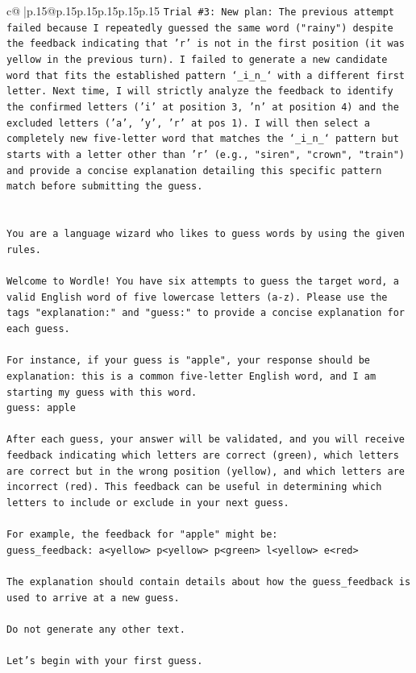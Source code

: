 \documentclass{article}
\begin{document}
{\begin{supertabular}{c@{$\;$}|p{.15\linewidth}@{}p{.15\linewidth}p{.15\linewidth}p{.15\linewidth}p{.15\linewidth}p{.15\linewidth}}
{{{\texttt{Trial \#3: New plan: The previous attempt failed because I repeatedly guessed the same word ("rainy") despite the feedback indicating that 'r' is not in the first position (it was yellow in the previous turn). I failed to generate a new candidate word that fits the established pattern `\_i\_n\_` with a different first letter. Next time, I will strictly analyze the feedback to identify the confirmed letters ('i' at position 3, 'n' at position 4) and the excluded letters ('a', 'y', 'r' at pos 1). I will then select a completely new five{-}letter word that matches the `\_i\_n\_` pattern but starts with a letter other than 'r' (e.g., "siren", "crown", "train") and provide a concise explanation detailing this specific pattern match before submitting the guess.} \\
\\ 
\\ 
\texttt{You are a language wizard who likes to guess words by using the given rules.} \\
\\ 
\texttt{Welcome to Wordle! You have six attempts to guess the target word, a valid English word of five lowercase letters (a{-}z). Please use the tags "explanation:" and "guess:" to provide a concise explanation for each guess.} \\
\\ 
\texttt{For instance, if your guess is "apple", your response should be} \\
\texttt{explanation: this is a common five{-}letter English word, and I am starting my guess with this word.} \\
\texttt{guess: apple} \\
\\ 
\texttt{After each guess, your answer will be validated, and you will receive feedback indicating which letters are correct (green), which letters are correct but in the wrong position (yellow), and which letters are incorrect (red). This feedback can be useful in determining which letters to include or exclude in your next guess.} \\
\\ 
\texttt{For example, the feedback for "apple" might be:} \\
\texttt{guess\_feedback: a<yellow> p<yellow> p<green> l<yellow> e<red>} \\
\\ 
\texttt{The explanation should contain details about how the guess\_feedback is used to arrive at a new guess.} \\
\\ 
\texttt{Do not generate any other text.} \\
\\ 
\texttt{Let's begin with your first guess.} \\
            }
        }
    }
     \\ \\


\end{supertabular}}
\end{document}
